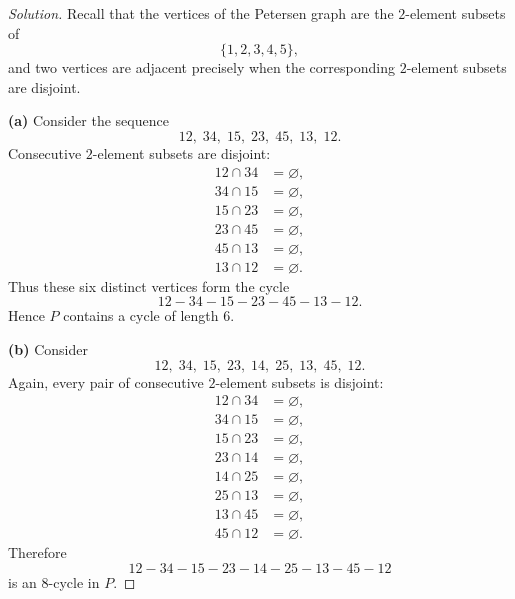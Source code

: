 \documentclass[12pt]{amsart}
\theoremstyle{conjecture}
\theoremstyle{definition}
\theoremstyle{question}
\theoremstyle{theorem}
\newenvironment{solution}
{\begin{proof}[Solution]}
{\end{proof}}
\begin{document}
    \begin{solution}
        Recall that the vertices of the Petersen graph are the $2$-element
        subsets of
        \[
            \{1,2,3,4,5\},
        \]
        and two vertices are adjacent precisely when the corresponding
        $2$-element subsets are disjoint.

        \medskip

        \noindent
        \textbf{(a)} Consider the sequence
        \[
            12,\;34,\;15,\;23,\;45,\;13,\;12.
        \]
        Consecutive $2$-element subsets are disjoint:
        \[
            \begin{aligned}
                12\cap34&=\varnothing,\\
                34\cap15&=\varnothing,\\
                15\cap23&=\varnothing,\\
                23\cap45&=\varnothing,\\
                45\cap13&=\varnothing,\\
                13\cap12&=\varnothing.
            \end{aligned}
        \]
        Thus these six distinct vertices form the cycle
        \[
            12-34-15-23-45-13-12.
        \]
        Hence $P$ contains a cycle of length $6$.

        \medskip

        \noindent
        \textbf{(b)} Consider
        \[
            12,\;34,\;15,\;23,\;14,\;25,\;13,\;45,\;12.
        \]
        Again, every pair of consecutive $2$-element subsets is disjoint:
        \[
            \begin{aligned}
                12\cap34&=\varnothing,\\
                34\cap15&=\varnothing,\\
                15\cap23&=\varnothing,\\
                23\cap14&=\varnothing,\\
                14\cap25&=\varnothing,\\
                25\cap13&=\varnothing,\\
                13\cap45&=\varnothing,\\
                45\cap12&=\varnothing.
            \end{aligned}
        \]
        Therefore
        \[
            12-34-15-23-14-25-13-45-12
        \]
        is an $8$-cycle in $P$.

        \medskip


\end{solution}
\end{document}
